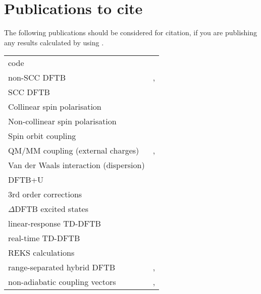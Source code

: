 \chapter{Publications to cite}

The following publications should be considered for citation, if you
are publishing any results calculated by using \dftbp.


\begin{tabular}{lr}
\dftbp{} code & \cite{dftbp-2020paper} \\
non-SCC DFTB & \cite{porezag-PRB-51-12947}, \cite{seifert-ijqc-58-185}
\\
SCC DFTB & \cite{elstner-prb-58-7260} \\
Collinear spin polarisation & \cite{koehler-cp-309-23} \\
Non-collinear spin polarisation & \cite{koehler-JPCA-111-5622} \\
Spin orbit coupling & \cite{koehler-JPCA-111-5622} \\
QM/MM coupling (external charges) & \cite{cui-jpcb-105-569},
\cite{han-ijqc-78-459} \\
Van der Waals interaction (dispersion) & \cite{elstner-jcp-114-5149} \\
DFTB+U & \cite{hourahine07}\\
3rd order corrections & \cite{yang-JPCA-111-10861} \\
$\Delta$DFTB excited states & \cite{irle-JCTC-12-313} \\
linear-response TD-DFTB  & \cite{niehaus-prb-63-085108}\\
real-time TD-DFTB  & \cite{realtime1}\\
REKS calculations & \cite{Lee_JCTC_2019} \\
range-separated hybrid DFTB & \cite{niehaus-PSSB-249-237},
                              \cite{lutsker-JCP-143-184107}\\
non-adiabatic coupling vectors &  \cite{niehaus2021ground}, \cite{niehaus2023exact}                             
\end{tabular}


